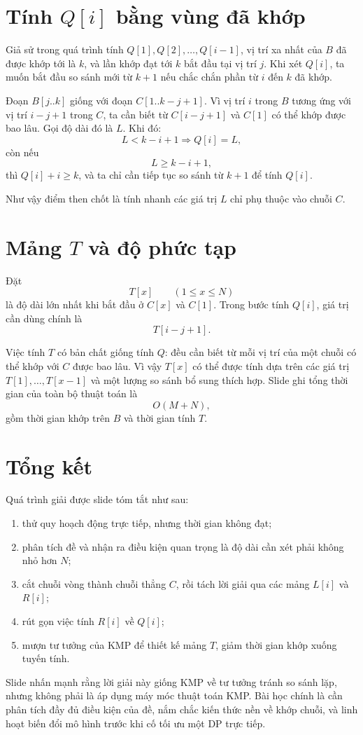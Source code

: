 \documentclass[11pt]{article}
\begin{document}
\section{Tính \texorpdfstring{\(Q[i]\)}{Q[i]} bằng vùng đã khớp}

Giả sử trong quá trình tính \(Q[1],Q[2],\ldots,Q[i-1]\), vị trí xa nhất của
\(B\) đã được khớp tới là \(k\), và lần khớp đạt tới \(k\) bắt đầu tại vị trí
\(j\). Khi xét \(Q[i]\), ta muốn bắt đầu so sánh mới từ \(k+1\) nếu chắc chắn
phần từ \(i\) đến \(k\) đã khớp.

Đoạn \(B[j..k]\) giống với đoạn \(C[1..k-j+1]\). Vì vị trí \(i\) trong
\(B\) tương ứng với vị trí \(i-j+1\) trong \(C\), ta cần biết từ
\(C[i-j+1]\) và \(C[1]\) có thể khớp được bao lâu. Gọi độ dài đó là \(L\).
Khi đó:
\[
  L<k-i+1 \Rightarrow Q[i]=L,
\]
còn nếu
\[
  L\ge k-i+1,
\]
thì \(Q[i]+i\ge k\), và ta chỉ cần tiếp tục so sánh từ \(k+1\) để tính
\(Q[i]\).

Như vậy điểm then chốt là tính nhanh các giá trị \(L\) chỉ phụ thuộc vào
chuỗi \(C\).

\section{Mảng \texorpdfstring{\(T\)}{T} và độ phức tạp}

Đặt
\[
  T[x]\qquad (1\le x\le N)
\]
là độ dài lớn nhất khi bắt đầu ở \(C[x]\) và \(C[1]\). Trong bước tính
\(Q[i]\), giá trị cần dùng chính là
\[
  T[i-j+1].
\]

Việc tính \(T\) có bản chất giống tính \(Q\): đều cần biết từ mỗi vị trí của
một chuỗi có thể khớp với \(C\) được bao lâu. Vì vậy \(T[x]\) có thể được
tính dựa trên các giá trị \(T[1],\ldots,T[x-1]\) và một lượng so sánh bổ sung
thích hợp. Slide ghi tổng thời gian của toàn bộ thuật toán là
\[
  O(M+N),
\]
gồm thời gian khớp trên \(B\) và thời gian tính \(T\).

\section{Tổng kết}

Quá trình giải được slide tóm tắt như sau:
\begin{enumerate}
  \item thử quy hoạch động trực tiếp, nhưng thời gian không đạt;
  \item phân tích đề và nhận ra điều kiện quan trọng là độ dài cần xét phải
  không nhỏ hơn \(N\);
  \item cắt chuỗi vòng thành chuỗi thẳng \(C\), rồi tách lời giải qua các
  mảng \(L[i]\) và \(R[i]\);
  \item rút gọn việc tính \(R[i]\) về \(Q[i]\);
  \item mượn tư tưởng của KMP để thiết kế mảng \(T\), giảm thời gian khớp
  xuống tuyến tính.
\end{enumerate}

Slide nhấn mạnh rằng lời giải này giống KMP về tư tưởng tránh so sánh lặp,
nhưng không phải là áp dụng máy móc thuật toán KMP. Bài học chính là cần phân
tích đầy đủ điều kiện của đề, nắm chắc kiến thức nền về khớp chuỗi, và linh
hoạt biến đổi mô hình trước khi cố tối ưu một DP trực tiếp.
\end{document}
